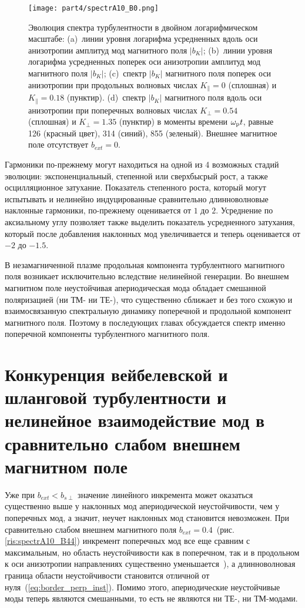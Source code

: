 \begin{figure}[h] 
\texttt{[image: part4/spectrA10\_B0.png]}
\caption{Эволюция спектра турбулентности в двойном логарифмическом масштабе: (a)~линии уровня логарифма усредненных вдоль оси анизотропии амплитуд мод магнитного поля $|b_K|$; 
(b)~линии уровня логарифма усредненных поперек оси анизотропии амплитуд мод магнитного поля $|b_K|$; 
(c)~спектр $|b_K|$ магнитного поля поперек оси анизотропии при продольных волновых числах $K_\|=0$ (сплошная) и $K_\|=0.18$ (пунктир). 
(d)~спектр $|b_K|$ магнитного поля вдоль оси анизотропии при поперечных волновых числах $K_\perp=0.54$ (сплошная) и $K_\perp=1.35$ (пунктир) в моменты времени $\omega_\mathrm{p} t$, равные 126 (красный цвет), 314 (синий), 855 (зеленый). Внешнее магнитное поле отсутствует $b_{ext}=0$.
}
\label{ris:spectrA10_B0}
\end{figure}

Гармоники по-прежнему могут находиться на одной из 4 возможных стадий эволюции: экспоненциальный, степенной или сверхбысрый рост, а также осцилляционное затухание. Показатель степенного роста, который могут испытывать и нелинейно индуцированные сравнительно длинноволновые наклонные гармоники, по-прежнему оценивается от $1$ до $2$. Усреднение по аксиальному углу позволяет также выделить показатель усредненного затухания, который после добавления наклонных мод увеличивается и теперь оценивается от $-2$ до $-1.5$.  

В незамагниченной плазме продольная компонента турбулентного магнитного поля возникает исключительно вследствие нелинейной генерации. Во внешнем магнитном поле неустойчивая апериодическая мода обладает смешанной поляризацией (ни ТМ- ни ТЕ-), что существенно сближает и без того схожую и взаимосвязанную спектральную динамику поперечной и продольной компонент магнитного поля. Поэтому в последующих главах обсуждается спектр именно поперечной компоненты турбулентного магнитного поля. 


\section{Конкуренция вейбелевской и шланговой турбулентности и нелинейное взаимодействие мод в сравнительно слабом внешнем магнитном поле}
\label{part_spectr_b4}
Уже при $b_{ext}< b_{s\perp}$ значение линейного инкремента может оказаться существенно выше у наклонных мод апериодической неустойчивости, чем у поперечных мод, а значит, неучет наклонных мод становится невозможен. При сравнительно слабом внешнем магнитного поля $b_{ext}=0.4$~(рис. \ref{ris:spectrA10_B44}) инкремент поперечных мод все еще сравним с максимальным, но область неустойчивости как в поперечном, так и в продольном к оси анизотропии направлениях существенно уменьшается~\cite{Emelyanov2023_Radiophys,Moya2022}), а длинноволновая граница области неустойчивости становится отличной от нуля~(\ref{eq:border_perp_inst}). Помимо этого, апериодические неустойчивые моды теперь являются смешанными, то есть не являются ни ТЕ-, ни ТМ-модами. 



